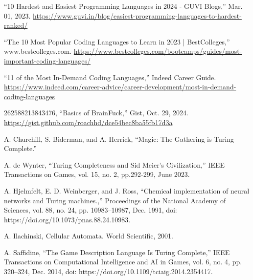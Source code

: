 \documentclass[12pt]{report} %
\begin{document}
    \begin{singlespace}

        \begin{thebibliography}{}

             “10 Hardest and Easiest Programming Languages in 2024 - GUVI Blogs,” Mar. 01, 2023. \href{https://www.guvi.in/blog/easiest-programming-languages-to-hardest-ranked/}{https://www.guvi.in/blog/easiest-programming-languages-to-hardest-ranked/}
            
             “The 10 Most Popular Coding Languages to Learn in 2023 | BestColleges,” www.bestcolleges.com. \href{https://www.bestcolleges.com/bootcamps/guides/most-important-coding-languages/}{https://www.bestcolleges.com/bootcamps/guides/most-important-coding-languages/}
            
             “11 of the Most In-Demand Coding Languages,” Indeed Career Guide. \href{https://www.indeed.com/career-advice/career-development/most-in-demand-coding-languages}{https://www.indeed.com/career-advice/career-development/most-in-demand-coding-languages}
            
             262588213843476, “Basics of BrainFuck,” Gist, Oct. 29, 2024. \href{https://gist.github.com/roachhd/dce54bec8ba55fb17d3a}{https://gist.github.com/roachhd/dce54bec8ba55fb17d3a}
            


             A. Churchill, S. Biderman, and A. Herrick, “Magic: The Gathering is Turing Complete.”
            
             A. de Wynter, “Turing Completeness and Sid Meier’s Civilization,” IEEE Transactions on Games, vol. 15, no. 2, pp.292-299, June 2023.
            
             A. Hjelmfelt, E. D. Weinberger, and J. Ross, “Chemical implementation of neural networks and Turing machines.,” Proceedings of the National Academy of Sciences, vol. 88, no. 24, pp. 10983–10987, Dec. 1991, doi: https://doi.org/10.1073/pnas.88.24.10983.
            
             A. Ilachinski, Cellular Automata. World Scientific, 2001.
            
             A. Saffidine, “The Game Description Language Is Turing Complete,” IEEE Transactions on Computational Intelligence and AI in Games, vol. 6, no. 4, pp. 320–324, Dec. 2014, doi: https://doi.org/10.1109/tciaig.2014.2354417.
            

\end{thebibliography}
\end{singlespace}
\end{document}
